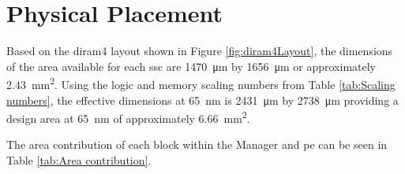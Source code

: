 \section{Physical Placement}
\label{sec:Physical Placement}

Based on the \ac{diram4} layout shown in Figure \ref{fig:diram4Layout}, the dimensions of the area available for each \ac{ssc} are \SI{1470}{\micro\meter} by \SI{1656}{\micro\meter} or approximately \SI{2.43}{\square\milli\meter}.
Using the logic and memory scaling numbers from Table \ref{tab:Scaling numbers}, the effective dimensions at \SI{65}{\nano\meter} is \SI{2431}{\micro\meter} by \SI{2738}{\micro\meter} providing a design area at \SI{65}{\nano\meter} of approximately \SI{6.66}{\square\milli\meter}.

The area contribution of each block within the Manager and \ac{pe} can be seen in Table \ref{tab:Area contribution}.
